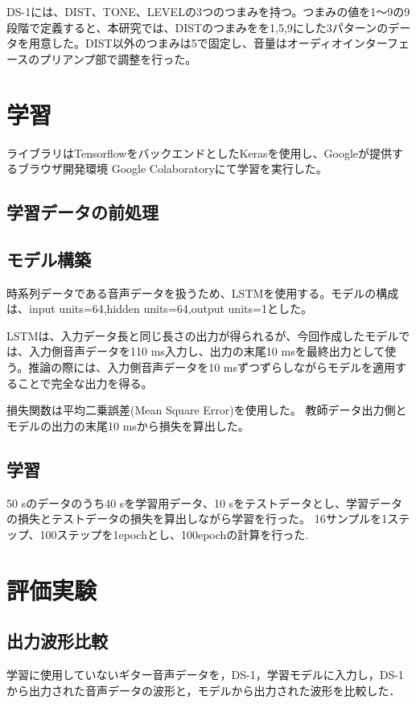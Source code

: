\documentclass{jreport}		%
\begin{document}
DS-1には、DIST、TONE、LEVELの3つのつまみを持つ。つまみの値を1～9の9段階で定義すると、本研究では、DISTのつまみをを1,5,9にした3パターンのデータを用意した。DIST以外のつまみは5で固定し、音量はオーディオインターフェースのプリアンプ部で調整を行った。

\section{学習}
ライブラリはTensorflowをバックエンドとしたKerasを使用し、Googleが提供するブラウザ開発環境 Google Colaboratoryにて学習を実行した。

\subsection{学習データの前処理}

\subsection{モデル構築}
時系列データである音声データを扱うため、LSTMを使用する。モデルの構成は、input units=64,hidden units=64,output units=1とした。

LSTMは、入力データ長と同じ長さの出力が得られるが、今回作成したモデルでは、入力側音声データを110 ms入力し、出力の末尾10 msを最終出力として使う。推論の際には、入力側音声データを10 msずつずらしながらモデルを適用することで完全な出力を得る。

損失関数は平均二乗誤差(Mean Square Error)を使用した。
教師データ出力側とモデルの出力の末尾10 msから損失を算出した。

\subsection{学習}
50 sのデータのうち40 sを学習用データ、10 sをテストデータとし、学習データの損失とテストデータの損失を算出しながら学習を行った。
16サンプルを1ステップ、100ステップを1epochとし、100epochの計算を行った.

\section{評価実験}
\subsection{出力波形比較}
学習に使用していないギター音声データを，DS-1，学習モデルに入力し，DS-1から出力された音声データの波形と，モデルから出力された波形を比較した．
\end{document}
